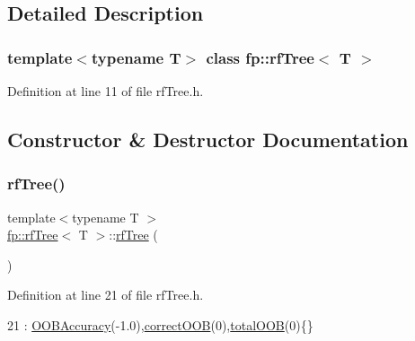 \subsection{Detailed Description}
\subsubsection*{template$<$typename T$>$\newline
class fp\+::rf\+Tree$<$ T $>$}



Definition at line 11 of file rf\+Tree.\+h.



\subsection{Constructor \& Destructor Documentation}
\mbox{\label{classfp_1_1rfTree_aace007592f5b94dd9c045207354ea7a6}} 
\subsubsection{\texorpdfstring{rf\+Tree()}{rfTree()}\hspace{0.1cm}{\footnotesize\ttfamily [1/2]}}
{\footnotesize\ttfamily template$<$typename T $>$ \\
\hyperlink{classfp_1_1rfTree}{fp\+::rf\+Tree}$<$ T $>$\+::\hyperlink{classfp_1_1rfTree}{rf\+Tree} (\begin{DoxyParamCaption}{ }\end{DoxyParamCaption})\hspace{0.3cm}{\ttfamily [inline]}}



Definition at line 21 of file rf\+Tree.\+h.


\begin{DoxyCode}
21 : \hyperlink{classfp_1_1rfTree_a673f85d4df6f292a1819351c092a07e1}{OOBAccuracy}(-1.0),\hyperlink{classfp_1_1rfTree_a83832650bcea8d63cdcd480d9ddc6e6e}{correctOOB}(0),\hyperlink{classfp_1_1rfTree_aa200dc228adc20c12e514364d2b674df}{totalOOB}(0)\{\}
\end{DoxyCode}
\mbox{\label{classfp_1_1rfTree_aace007592f5b94dd9c045207354ea7a6}} 
